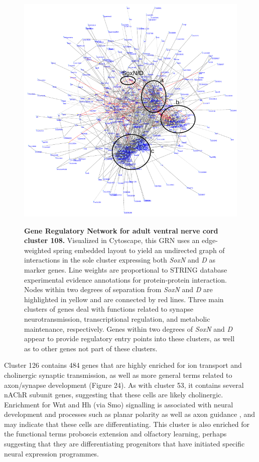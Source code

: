 \documentclass[withindex,glossary]{cam-thesis}
\begin{document}
\setcounter{figure}{27-1}
\begin{figure}[!htbp]
\centering
\includegraphics[width=\textwidth]{figs/Fig27 Network v2}
\label{fig27}
\caption{\textbf{Gene Regulatory Network for adult ventral nerve cord cluster 108.} Visualized in Cytoscape, this GRN uses an edge-weighted spring embedded layout to yield an undirected graph of interactions in the sole cluster expressing both \emph{SoxN} and \emph{D} as marker genes. Line weights are proportional to STRING database experimental evidence annotations for protein-protein interaction. Nodes within two degrees of separation from \emph{SoxN} and \emph{D} are highlighted in yellow and are connected by red lines. Three main clusters of genes deal with functions related to synapse neurotransmission, transcriptional regulation, and metabolic maintenance, respectively. Genes within two degrees of \emph{SoxN} and \emph{D} appear to provide regulatory entry points into these clusters, as well as to other genes not part of these clusters.}
\end{figure}

Cluster 126 contains 484 genes that are highly enriched for ion
transport and cholinergic synaptic transmission, as well as more general
terms related to axon/synapse development (Figure 24). As with cluster
53, it contains several nAChR subunit genes, suggesting that these cells
are likely cholinergic. Enrichment for Wnt and Hh (via Smo) signalling
is associated with neural development and processes such as planar
polarity  as well as axon guidance , and may indicate that these cells are
differentiating. This cluster is also enriched for the functional terms
proboscis extension and olfactory learning, perhaps suggesting that they
are differentiating progenitors that have initiated specific neural
expression programmes.
\end{document}
